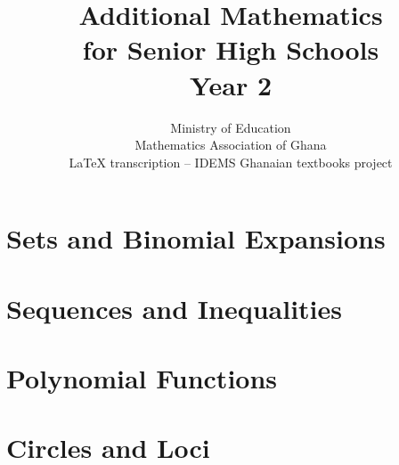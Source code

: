 \documentclass[11pt]{report}
\title{\textbf{Additional Mathematics}\\[0.5ex]\Large for Senior High Schools\\[2ex]\LARGE Year 2}
\author{Ministry of Education\\Mathematics Association of Ghana\\[3ex]
  \normalsize LaTeX transcription -- IDEMS Ghanaian textbooks project}
\date{}
\begin{document}
\maketitle
\tableofcontents

\chapter{Sets and Binomial Expansions}









\chapter{Sequences and Inequalities}













\chapter{Polynomial Functions}










\chapter{Circles and Loci}






\end{document}
